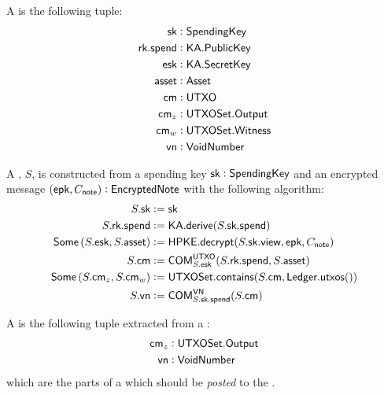 \begin{definition}
    A \Sender{} is the following tuple:
    \begin{align*}
        {\textsf{sk}}        &: {\textsf{SpendingKey}} \\
        {\textsf{rk}}.{\textsf{spend}} &: {\textsf{KA}}.{\textsf{PublicKey}} \\ 
        {\textsf{esk}}       &: {\textsf{KA}}.{\textsf{SecretKey}} \\
        {\textsf{asset}}     &: {\textsf{Asset}} \\
        {\textsf{cm}}        &: {\textsf{UTXO}} \\
        {\textsf{cm}}_z      &: {\textsf{UTXOSet}}.{\textsf{Output}} \\
        {\textsf{cm}}_w      &: {\textsf{UTXOSet}}.{\textsf{Witness}} \\
        {\textsf{vn}}        &: {\textsf{VoidNumber}}
    \end{align*}

    A \Sender{}, $S$, is constructed from a spending key ${\textsf{sk}} : {\textsf{SpendingKey}}$ and an encrypted message $({\textsf{epk}}, C_{\textsf{note}}) : {\textsf{EncryptedNote}}$ with the following algorithm:
    \begin{align*}
        S.{\textsf{sk}}                              &:= {\textsf{sk}} \\
        S.{\textsf{rk}}.{\textsf{spend}}                       &:= {\textsf{KA}}.{\textsf{derive}}(S.{\textsf{sk}}.{\textsf{spend}}) \\
        {\textsf{Some}}\left(S.{\textsf{esk}}, S.{\textsf{asset}}\right) &:= {\textsf{HPKE}}.{\textsf{decrypt}}(S.{\textsf{sk}}.{\textsf{view}}, {\textsf{epk}}, C_{\textsf{note}}) \\
        S.{\textsf{cm}}                              &:= {\textsf{COM}}^{{\textsf{UTXO}}}_{S.{\textsf{esk}}}(S.{\textsf{rk}}.{\textsf{spend}}, S.{\textsf{asset}}) \\
        {\textsf{Some}}\left(S.{\textsf{cm}}_z, S.{\textsf{cm}}_w\right) &:= {\textsf{UTXOSet}}.{\textsf{contains}}(S.{\textsf{cm}}, {\textsf{Ledger}}.{\textsf{utxos}}()) \\
        S.{\textsf{vn}}                              &:= {\textsf{COM}}^{{\textsf{VN}}}_{S.{\textsf{sk}}.{\textsf{spend}}}(S.{\textsf{cm}})
    \end{align*}
\end{definition}

\begin{definition}
    A \SenderPost{} is the following tuple extracted from a \Sender{}:
    \begin{align*}
        {\textsf{cm}}_z &: {\textsf{UTXOSet}}.{\textsf{Output}} \\
        {\textsf{vn}}   &: {\textsf{VoidNumber}}
    \end{align*}
    which are the parts of a \Sender{} which should be \emph{posted} to the \Ledger{}.
\end{definition}

